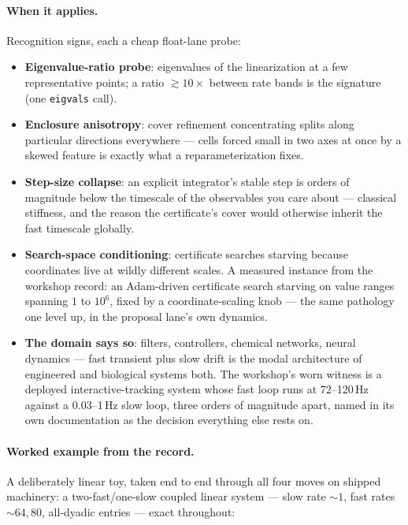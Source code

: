 \paragraph{When it applies.} Recognition signs, each a cheap
float-lane probe:
\begin{itemize}
\item \textbf{Eigenvalue-ratio probe}: eigenvalues of the
  linearization at a few representative points; a ratio
  ${\gtrsim}10\times$ between rate bands is the signature (one
  \texttt{eigvals} call).
\item \textbf{Enclosure anisotropy}: cover refinement concentrating
  splits along particular directions everywhere --- cells forced small
  in two axes at once by a skewed feature is exactly what a
  reparameterization fixes.
\item \textbf{Step-size collapse}: an explicit integrator's stable
  step is orders of magnitude below the timescale of the observables
  you care about --- classical stiffness, and the reason the
  certificate's cover would otherwise inherit the fast timescale
  globally.
\item \textbf{Search-space conditioning}: certificate searches
  starving because coordinates live at wildly different scales. A
  measured instance from the workshop record: an Adam-driven
  certificate search starving on value ranges spanning $1$ to $10^6$,
  fixed by a coordinate-scaling knob --- the same pathology one level
  up, in the proposal lane's own dynamics.
\item \textbf{The domain says so}: filters, controllers, chemical
  networks, neural dynamics --- fast transient plus slow drift is the
  modal architecture of engineered and biological systems both. The
  workshop's worn witness is a deployed interactive-tracking system
  whose fast loop runs at 72--120\,Hz against a 0.03--1\,Hz slow
  loop, three orders of magnitude apart, named in its own
  documentation as the decision everything else rests on.
\end{itemize}

\paragraph{Worked example from the record.} A deliberately linear toy,
taken end to end through all four moves on shipped machinery: a
two-fast/one-slow coupled linear system --- slow rate ${\sim}1$, fast
rates ${\sim}64, 80$, all-dyadic entries --- exact throughout:

